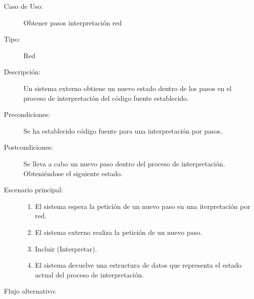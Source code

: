 \begin{description}
   \item[Caso de Uso:]  Obtener pasos interpretación red 
   \item [Tipo:] Red
   \item[Descripción:] 
   Un sistema externo obtiene un nuevo estado dentro de los pasos en el proceso de
   interpretación del código fuente establecido.
   \item[Precondiciones:] 
   Se ha establecido código fuente para una interpretación por pasos.
   \item[Postcondiciones:] 
   Se lleva a cabo un nuevo paso dentro del proceso de interpretación. Obteniéndose el 
   siguiente estado.
   \item[Escenario principal:] \hfill
   \begin{enumerate}
   \item El sistema espera la petición de un nuevo paso en una iterpretación por red.
   \item El sistema externo realiza la petición de un nuevo paso.
   \item Incluir (Interpretar).
   \item El sistema devuelve una estructura de datos que representa 
   el estado actual del proceso de interpretación.
   \end{enumerate}
   \item[Flujo alternativo:] \hfill 
   \begin{enumerate} \itemsep1pt \parskip0pt 
   \setcounter{enumi}{0}
   \renewcommand{\labelenumi}{}
   \renewcommand{\labelenumiii}{\arabic{enumiii}.}
   \renewcommand{\labelenumii}{\arabic{enumi}\alph{enumii}.}

\end{enumerate}
\end{description}
